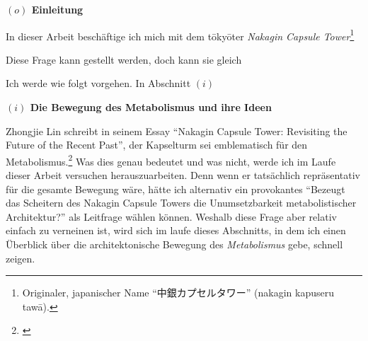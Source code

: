 \documentclass[a4paper, 12pt]{article}
\begin{document}
\begin{onehalfspace} 

\noindent\textbf{$(o)$ Einleitung}

\noindent In dieser Arbeit beschäftige ich mich mit dem tōkyōter \emph{Nakagin Capsule Tower}\footnote{Originaler, japanischer Name "`中銀カプセルタワー"' (nakagin kapuseru tawā).}



Diese Frage kann gestellt werden, doch kann sie gleich 

\vspace{3mm}

Ich werde wie folgt vorgehen. In Abschnitt $(i)$ 

\vspace{5mm}
\noindent\textbf{$(i)$ Die Bewegung des Metabolismus und ihre Ideen} %

\noindent Zhongjie Lin schreibt in seinem Essay "`Nakagin Capsule Tower: Revisiting the Future of the Recent Past"', der Kapselturm sei emblematisch für den Metabolismus.\footnote{\Cite[Siehe][S. 243]{gleiter}} Was dies genau bedeutet und was nicht, werde ich im Laufe dieser Arbeit versuchen herauszuarbeiten. Denn wenn er tatsächlich repräsentativ für die gesamte Bewegung wäre, hätte ich alternativ ein provokantes "`Bezeugt das Scheitern des Nakagin Capsule Towers die Unumsetzbarkeit metabolistischer Architektur?"' als Leitfrage wählen können. Weshalb diese Frage aber relativ einfach zu verneinen ist, wird sich im laufe dieses Abschnitts, in dem ich einen Überblick über die architektonische Bewegung des \emph{Metabolismus} gebe, schnell zeigen.


\end{onehalfspace}
\end{document}
